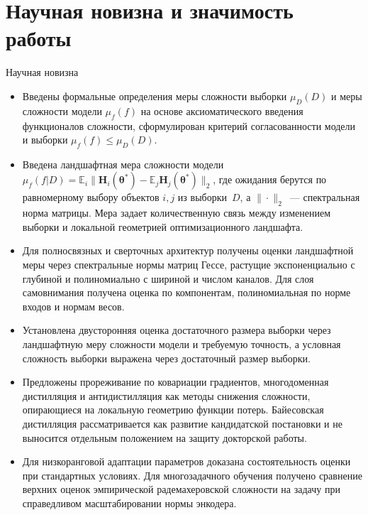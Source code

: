 \documentclass[9pt,pdf,hyperref={unicode}]{beamer}
\begin{document}
\section{Научная новизна и значимость работы}
\begin{frame}{Научная новизна}
\justifying
\footnotesize
\begin{itemize}
    \justifying
    \item Введены формальные определения меры сложности выборки $\mu_D(D)$ и меры сложности модели $\mu_f(f)$ на основе аксиоматического введения функционалов сложности, сформулирован критерий согласованности модели и выборки $\mu_f(f) \le \mu_D(D)$.
    \item Введена ландшафтная мера сложности модели $\mu_f(f|D) = \mathbb{E}_{i}\big\|\mathbf{H}_{i}(\boldsymbol{\theta}^*)-\mathbb{E}_{j}\mathbf{H}_{j}(\boldsymbol{\theta}^*)\big\|_2$, где ожидания берутся по равномерному выбору объектов $i,j$ из выборки~$D$, а $\|\cdot\|_2$~--- спектральная норма матрицы. Мера задает количественную связь между изменением выборки и локальной геометрией оптимизационного ландшафта.
    \item Для полносвязных и сверточных архитектур получены оценки ландшафтной меры через спектральные нормы матриц Гессе, растущие экспоненциально с глубиной и полиномиально с шириной и числом каналов. Для слоя самовнимания получена оценка по компонентам, полиномиальная по норме входов и нормам весов.
    \item Установлена двусторонняя оценка достаточного размера выборки через ландшафтную меру сложности модели и требуемую точность, а условная сложность выборки выражена через достаточный размер выборки.
    \item Предложены прореживание по ковариации градиентов, многодоменная дистилляция и антидистилляция как методы снижения сложности, опирающиеся на локальную геометрию функции потерь. Байесовская дистилляция рассматривается как развитие кандидатской постановки и не выносится отдельным положением на защиту докторской работы.
    \item Для низкоранговой адаптации параметров доказана состоятельность оценки при стандартных условиях. Для многозадачного обучения получено сравнение верхних оценок эмпирической радемахеровской сложности на задачу при справедливом масштабировании нормы энкодера.
\end{itemize}
\end{frame}
\end{document}
